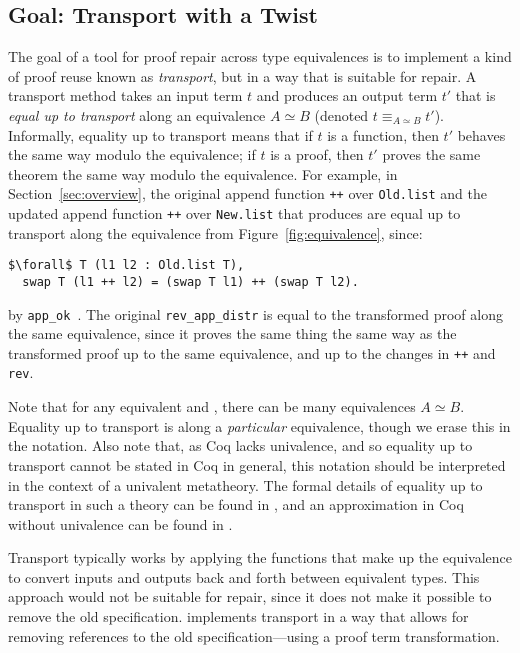 \subsection{Goal: Transport with a Twist}
\label{sec:repair}

The goal of a tool for proof repair across type equivalences is to implement a kind of proof reuse known as \textit{transport},
but in a way that is suitable for repair.
A transport method takes an input term $t$ and produces an output term $t'$ that is \textit{equal up to transport}
along an equivalence $A \simeq B$ (denoted $t \equiv_{A \simeq B} t'$).
Informally, equality up to transport means that if $t$ is a function, then $t'$ behaves the same way modulo the equivalence;
if $t$ is a proof, then $t'$ proves the same theorem the same way modulo the equivalence.
For example, in Section~\ref{sec:overview}, the original append function \lstinline{++} over \lstinline{Old.list}
and the updated append function \lstinline{++} over \lstinline{New.list} that \toolname produces are
equal up to transport along the equivalence from Figure~\ref{fig:equivalence}, since:

\begin{lstlisting}
$\forall$ T (l1 l2 : Old.list T),
  swap T (l1 ++ l2) = (swap T l1) ++ (swap T l2).
\end{lstlisting}
by \lstinline{app_ok}~.
The original \lstinline{rev_app_distr} is equal to the transformed proof along the same equivalence,
since it proves the same thing the same way as the transformed proof up to the same equivalence, and up to the changes in \lstinline{++}
and \lstinline{rev}.

Note that for any equivalent \A and \B, there can be many equivalences $A \simeq B$.
Equality up to transport is along a \textit{particular} equivalence, though we erase this in the notation.
Also note that, as Coq lacks univalence, and so equality up to transport cannot be stated in Coq in general,
this notation should be interpreted in the context of a univalent metatheory.
The formal details of equality up to transport in such a theory can be found in \citet{univalent2013homotopy}, and an approximation in Coq without univalence can be found in \citet{tabareau2017equivalences}.

Transport typically works by applying the functions that make up the equivalence to convert
inputs and outputs back and forth between equivalent types.
This approach would not be suitable for repair, since it does not make it possible to remove the old specification.
\toolname implements transport in a way that allows for removing references to the old specification---using a proof term transformation.

